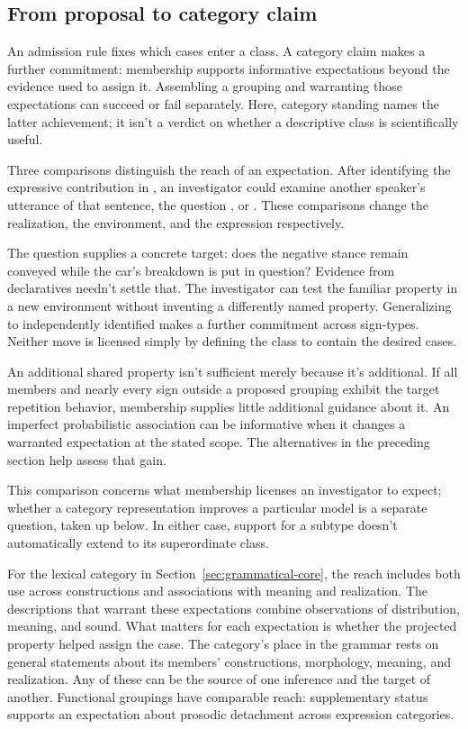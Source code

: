 \documentclass[12pt]{article}
\begin{document}
\subsection{From proposal to category claim}

An admission rule fixes which cases enter a class. A category claim
makes a further commitment: membership supports informative expectations
beyond the evidence used to assign it. Assembling a grouping and
warranting those expectations can succeed or fail separately. Here,
category standing names the latter achievement; it isn't a verdict
on whether a descriptive class is scientifically useful.

Three comparisons distinguish the reach of an expectation.
After identifying the expressive contribution in , an investigator could examine another speaker's utterance
of that sentence, the question ,
or . These comparisons change the
realization, the environment, and the expression respectively.

The question supplies a concrete target: does the negative stance
remain conveyed while the car's breakdown is put in question? Evidence
from declaratives needn't settle that. The investigator can test the
familiar property in a new environment without inventing a differently
named property. Generalizing to independently identified 
makes a further commitment across sign-types. Neither move is licensed
simply by defining the class to contain the desired cases.

An additional shared property isn't sufficient merely because it's
additional. If all members and nearly every sign outside a proposed
grouping exhibit the target repetition behavior, membership supplies
little additional guidance about it. An imperfect probabilistic association can be
informative when it changes a warranted expectation at the stated
scope. The alternatives in the preceding section help assess that gain.

This comparison concerns what membership licenses an investigator to
expect; whether a category representation improves a particular model is
a separate question, taken up below. In either case, support for a subtype
doesn't automatically extend to its superordinate class.

For the lexical category in Section~\ref{sec:grammatical-core}, the reach
includes both use across constructions and associations with meaning
and realization. The descriptions that warrant these expectations combine
observations of distribution, meaning, and sound. What matters for each
expectation is whether the projected property helped assign the case. The
category's place in the grammar rests on general statements about its
members' constructions, morphology, meaning, and realization. Any of these
can be the source of one inference and the target of another. Functional groupings
have comparable reach: supplementary status supports an expectation about
prosodic detachment across expression categories.
\end{document}
